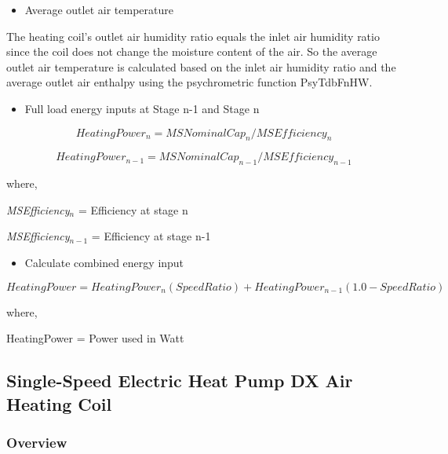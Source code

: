 \begin{itemize}
  \item Average outlet air temperature
\end{itemize}

    The heating coil's outlet air humidity ratio equals the inlet air humidity ratio since the coil does not change the moisture content of the air. So the average outlet air temperature is calculated based on the inlet air humidity ratio and the average outlet air enthalpy using the psychrometric function PsyTdbFnHW.

\begin{itemize}
  \item
    Full load energy inputs at Stage n-1 and Stage n
\end{itemize}

\begin{equation}
HeatingPowe{r_n} = MSNominalCa{p_n}/MSEfficienc{y_n}
\end{equation}

\begin{equation}
HeatingPowe{r_{n - 1}} = MSNominalCa{p_{n - 1}}/MSEfficienc{y_{n - 1}}
\end{equation}

where,

\emph{MSEfficiency\(_{n}\)} = Efficiency at stage n

\emph{MSEfficiency\(_{n-1}\)} = Efficiency at stage n-1

\begin{itemize}
  \item Calculate combined energy input
\end{itemize}

\begin{equation}
HeatingPower = HeatingPowe{r_n}\left( {SpeedRatio} \right) + HeatingPowe{r_{n - 1}}(1.0 - SpeedRatio)
\end{equation}

where,

HeatingPower = Power used in Watt

\subsection{Single-Speed Electric Heat Pump DX Air Heating Coil}\label{single-speed-electric-heat-pump-dx-air-heating-coil}

\subsubsection{Overview}\label{overview-6-000}

